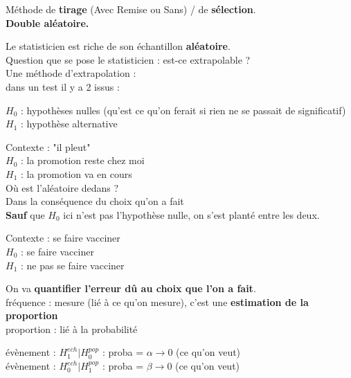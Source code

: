 \documentclass[12pt,a4paper]{article}
\begin{document}
	Méthode de \textbf{tirage} (Avec Remise ou Sans) / de \textbf{sélection}.\\
	
	\textbf{Double aléatoire.}
	
	Le statisticien est riche de son échantillon \textbf{aléatoire}.\\
	Question que se pose le statisticien : est-ce extrapolable ?\\
	Une méthode d'extrapolation :\\
	
	dans un test il y a 2 issus : \begin{minipage}[t]{10cm}
		 $H_0$ : hypothèses nulles (qu'est ce qu'on ferait si rien ne se passait de significatif)\\
		 $H_1$ : hypothèse alternative
	\end{minipage}
	
	\begin{ex}
		Contexte : "il pleut"\\
		$H_0$ : la promotion reste chez moi\\
		$H_1$ : la promotion va en cours\\
		
		Où est l'aléatoire dedans ?\\
		Dans la conséquence du choix qu'on a fait\\
		
		\textbf{Sauf} que $H_0$ ici n'est pas l'hypothèse nulle, on s'est planté entre les deux.
	\end{ex}
	
	\begin{ex} Contexte : se faire vacciner\\
		$H_0$ : se faire vacciner \\
		$H_1$ : ne pas se faire vacciner 
	\end{ex}
	
	On va \textbf{quantifier l'erreur dû au choix que l'on a fait}.\\
	
	\hspace{-.7cm}fréquence : mesure (lié à ce qu'on mesure), c'est une \textbf{estimation de la proportion}\\
	proportion : lié à la probabilité 
	
	\vspace{.5cm}
	
	\hspace{-.6cm}évènement : $H_1^{ech}| H_0^{pop}$ : proba = $\alpha \to 0$ (ce qu'on veut)\\
	évènement : $H_0^{ech}| H_1^{pop}$ : proba = $\beta \to 0$ (ce qu'on veut)
	
\end{document}
